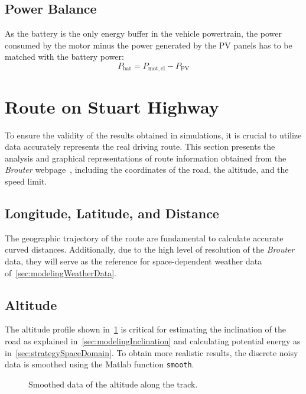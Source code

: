 \subsection{Power Balance}
\label{sec:modelPowerBalance}
As the battery is the only energy buffer in the vehicle powertrain, the power consumed by the motor minus the power generated by the PV panels has to be matched with the battery power:
\begin{equation}
	P_\mathrm{bat} = P_\mathrm{mot,el} - P_\mathrm{PV} \label{eq:powerBalance}
\end{equation}

\newpage
\section{Route on Stuart Highway}
\label{sec:modelingRouteData}
To ensure the validity of the results obtained in simulations, it is crucial to utilize data accurately represents the real driving route. This section presents the analysis and graphical representations of route information obtained from the \textit{Brouter} webpage~\cite{brouter:2022webpage}, including the coordinates of the road, the altitude, and the speed limit.


\subsection{Longitude, Latitude, and Distance}
The geographic trajectory of the route are fundamental to calculate accurate curved distances. Additionally, due to the high level of resolution of the \textit{Brouter} data, they will serve as the reference for space-dependent weather data of~\cref{sec:modelingWeatherData}.


\subsection{Altitude}
The altitude profile shown in~\cref{fig:altitude} is critical for estimating the inclination of the road as explained in~\cref{sec:modelingInclination} and calculating potential energy as in~\cref{sec:strategySpaceDomain}. To obtain more realistic results, the discrete noisy data is smoothed using the Matlab function \texttt{smooth}.
\begin{figure}[htbp]
	\centering
	
	\caption{Smoothed data of the altitude along the track.}
	\label{fig:altitude}
\end{figure}


